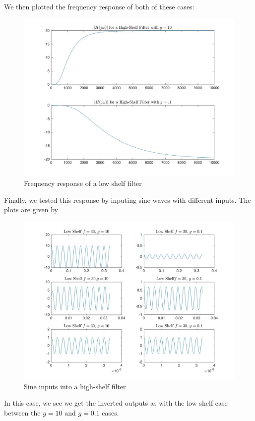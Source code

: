 \documentclass{article}
\begin{document}
    
        \FloatBarrier
 We then plotted the frequency response of both of these cases:
 
 \begin{figure}[!htb]
        \centering
        \includegraphics[width=0.6\linewidth, height=0.3\textheight]{highshelf.jpg}
        \caption{Frequency response of a low shelf filter}
\end{figure}
\FloatBarrier
Finally, we tested this response by inputing sine waves with different inputs. The plots are given by 

 \begin{figure}[!htb]
        \centering
        \includegraphics[width=0.8\linewidth, height=0.4\textheight]{lowsine.jpg}
        \caption{Sine inputs into a high-shelf filter}
\end{figure}
\FloatBarrier

In this case, we see we get the inverted outputs as with the low shelf case between the $g=10$ and $g=0.1$ cases. 
\end{document}
